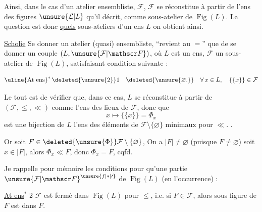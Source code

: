 Ainsi, dans le cas d'un atelier ensembliste, $\mathcal F$, $\mathcal F$ se réconstitue à partir de  l'ens des figures  $\unsure{\mathcal L|L}$ qu'il décrit, comme sous-atelier de $\operatorname{Fig}(L)$. La question est donc \uline{quels} sous-ateliers d'un ens $L$ on obtient ainsi.

\uline{Scholie} Se donner un atelier (quasi) ensembliste, ``revient au $=$'' que de se donner un couple $(L,\unsure{\mathcal F|\mathscr F})$, où $L$ est un ens, $\mathcal F$ un sous-atelier de $\operatorname{Fig}(L)$, satisfaisant  condition suivante :


\[
\text{\uline{At ens}}^{*}\,\deleted{\unsure{2}}1\quad \deleted{\unsure{\varnothing .}}\quad
\forall\,x\in L,\quad\{\{x\}\}\in\mathcal F
\]

 Le tout est de vérifier que, dans ce cas, $L$ se réconstitue à partir de $(\mathcal F,\leq,\ll)$ comme l'ens des lieux de $\mathcal F$, donc que
\[
x\longmapsto\{\{x\}\}=\Phi_x
\]
est une bijection de $L$  l'ens des éléments de $\mathcal F\setminus\{\varnothing\}$ minimaux pour $\ll$. .

Or soit $F\in\deleted{\unsure{\Phi}}\mathcal F\setminus\{\varnothing\}$,    On a $|F|\ne\varnothing$ (puisque $F\ne\varnothing$) soit $x\in |F|$, alors $\Phi_x\ll F$, donc $\Phi_x=F$, cqfd.

Je rappelle pour mémoire les conditions   pour qu'une partie ${\unsure{\mathcal F|\mathscr F}}^{\unsure{f|*|\prime}}$ de $\operatorname{Fig}(L)$ (en l'occurrence) :

\uline{At ens$^{*}$} 2 \quad $\mathcal F$ est fermé dans $\operatorname{Fig}(L)$ pour $\leq$, i.e. si $F\in\mathcal F$, alors  sous figure de $F$ est dans $F$.

